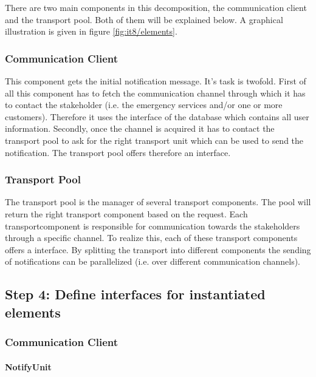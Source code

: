 \npar There are two main components in this decomposition, the communication
client and the transport pool. Both of them will be explained below. A graphical
illustration is given in figure \ref{fig:it8/elements}.

\subsubsection{Communication Client} 
\npar This component gets the initial notification message. It's task is
twofold. First of all this component has to fetch the communication channel
through which it has to contact the stakeholder (i.e. the emergency services
and/or one or more customers). Therefore it uses the 
interface of the database which contains all user information. Secondly, once
the channel is acquired it has to contact the transport pool to ask for the
right transport unit which can be used to send the notification. The transport
pool offers therefore an  interface.

\subsubsection{Transport Pool}

\npar The transport pool is the manager of several transport components. The
pool will return the right transport component based on the request. Each
transportcomponent is responsible for communication towards the stakeholders
through a specific channel. To realize this, each of these transport components
offers a  interface. By splitting the transport into different
components the sending of notifications can be parallelized (i.e. over
different communication channels).

\subsection{Step 4: Define interfaces for instantiated elements}
\label{add:it8/interfaces}

\subsubsection{Communication Client}

\paragraph{NotifyUnit}

